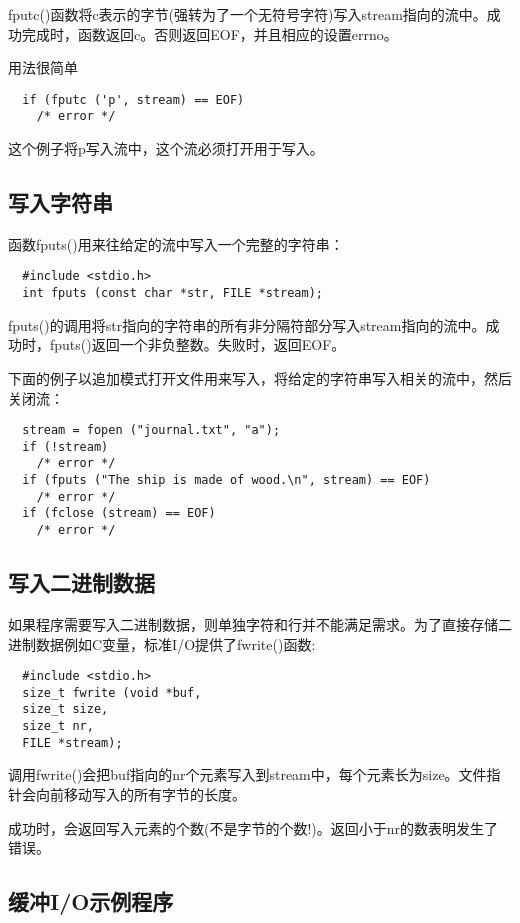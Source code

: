 fputc()函数将c表示的字节(强转为了一个无符号字符)写入stream指向的流中。成功完成时，函数返回c。否则返回EOF，并且相应的设置errno。

用法很简单
\begin{lstlisting}
  if (fputc ('p', stream) == EOF)
    /* error */
\end{lstlisting}

这个例子将p写入流中，这个流必须打开用于写入。

\subsection{写入字符串}

函数fputs()用来往给定的流中写入一个完整的字符串：
\begin{lstlisting}
  #include <stdio.h>
  int fputs (const char *str, FILE *stream);
\end{lstlisting}

fputs()的调用将str指向的字符串的所有非分隔符部分写入stream指向的流中。成功时，fputs()返回一个非负整数。失败时，返回EOF。

下面的例子以追加模式打开文件用来写入，将给定的字符串写入相关的流中，然后关闭流：
\begin{lstlisting}
  stream = fopen ("journal.txt", "a");
  if (!stream)
    /* error */
  if (fputs ("The ship is made of wood.\n", stream) == EOF)
    /* error */
  if (fclose (stream) == EOF)
    /* error */
\end{lstlisting}


\subsection{写入二进制数据}

如果程序需要写入二进制数据，则单独字符和行并不能满足需求。为了直接存储二进制数据例如C变量，标准I/O提供了fwrite()函数:
\begin{lstlisting}
  #include <stdio.h>
  size_t fwrite (void *buf,
  size_t size,
  size_t nr,
  FILE *stream);
\end{lstlisting}

调用fwrite()会把buf指向的nr个元素写入到stream中，每个元素长为size。文件指针会向前移动写入的所有字节的长度。

成功时，会返回写入元素的个数(不是字节的个数!)。返回小于nr的数表明发生了错误。

\subsection{缓冲I/O示例程序}

